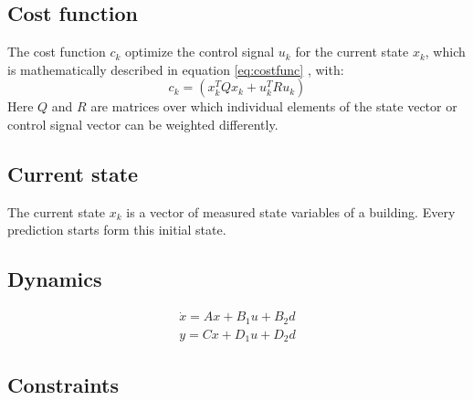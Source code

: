 \subsection{Cost function}
\label{subsection:costfunction}
The cost function $c_k$ optimize the control signal $u_k$ for the current state $x_k$, which is mathematically described in equation
\ref{eq:costfunc}
, with:
\begin{equation}
\label{eq:c_k}
c_k = (x_k^TQx_k+u_k^TRu_k)
\end{equation}
Here $Q$ and $R$ are matrices over which individual elements of the state vector or control signal vector can be weighted differently.  
\cite{Kouvaritakis.2016}
\subsection{Current state}
\label{subsection:currentstate}
The current state $x_k$ is a vector of measured state variables of a building. Every prediction starts form this initial state\cite{Oldewurtel.2012}.
\subsection{Dynamics}
\label{subsection:dynamics}
\begin{align}
\label{eq:statespace}
\dot{x}=Ax+B_1u+B_2d\\
y=Cx+D_1u+D_2d
\end{align}


\subsection{Constraints}
\label{subsection:constraints}




%
%




